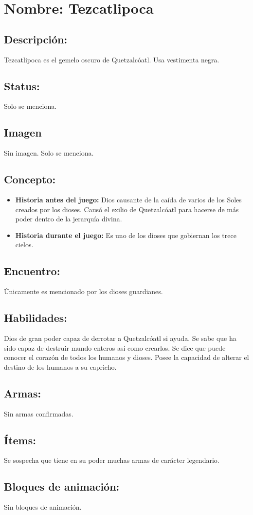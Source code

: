 \section{Nombre: Tezcatlipoca}  \label{per:tezcatlipoca}
\subsection{Descripción:}
Tezcatlipoca es el gemelo oscuro de Quetzalcóatl. Usa vestimenta negra. 
\subsection{Status:}
Solo se menciona.
\subsection{Imagen}
Sin imagen. Solo se menciona.
\subsection{Concepto:}
\begin{itemize}
	\item \textbf{Historia antes del juego:}
	Dios causante de la caída de varios de los Soles creados por los dioses. Causó el exilio de Quetzalcóatl para hacerse de más poder dentro de la jerarquía divina. 
	\item \textbf{Historia durante el juego:}
	Es uno de los dioses que gobiernan los trece cielos.
\end{itemize} 
\subsection{Encuentro:}
Únicamente es mencionado por los dioses guardianes.
\subsection{Habilidades:}
Dios de gran poder capaz de derrotar a Quetzalcóatl si ayuda. Se sabe que ha sido capaz de destruir mundo enteros así como crearlos. Se dice que puede conocer el corazón de todos los humanos y dioses. Posee la capacidad de alterar el destino de los humanos a su capricho.
\subsection{Armas:}
Sin armas confirmadas.
\subsection{Ítems:}
Se sospecha que tiene en su poder muchas armas de carácter legendario.
\subsection{Bloques de animación:}
Sin bloques de animación.